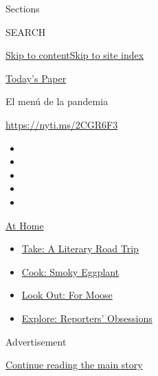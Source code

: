 Sections

SEARCH

\protect\hyperlink{site-content}{Skip to
content}\protect\hyperlink{site-index}{Skip to site index}

\href{https://myaccount.nytimes3xbfgragh.onion/auth/login?response_type=cookie\&client_id=vi}{}

\href{https://www.nytimes3xbfgragh.onion/section/todayspaper}{Today's
Paper}

El menú de la pandemia

\url{https://nyti.ms/2CGR6F3}

\begin{itemize}
\item
\item
\item
\item
\item
\end{itemize}

\href{https://www.nytimes3xbfgragh.onion/spotlight/at-home?action=click\&pgtype=Article\&state=default\&region=TOP_BANNER\&context=at_home_menu}{At
Home}

\begin{itemize}
\tightlist
\item
  \href{https://www.nytimes3xbfgragh.onion/2020/07/28/books/time-for-a-literary-road-trip.html?action=click\&pgtype=Article\&state=default\&region=TOP_BANNER\&context=at_home_menu}{Take:
  A Literary Road Trip}
\item
  \href{https://www.nytimes3xbfgragh.onion/2020/07/29/magazine/bored-with-your-home-cooking-some-smoky-eggplant-will-fix-that.html?action=click\&pgtype=Article\&state=default\&region=TOP_BANNER\&context=at_home_menu}{Cook:
  Smoky Eggplant}
\item
  \href{https://www.nytimes3xbfgragh.onion/2020/07/27/travel/moose-michigan-isle-royale.html?action=click\&pgtype=Article\&state=default\&region=TOP_BANNER\&context=at_home_menu}{Look
  Out: For Moose}
\item
  \href{https://www.nytimes3xbfgragh.onion/interactive/2020/at-home/even-more-reporters-editors-diaries-lists-recommendations.html?action=click\&pgtype=Article\&state=default\&region=TOP_BANNER\&context=at_home_menu}{Explore:
  Reporters' Obsessions}
\end{itemize}

Advertisement

\protect\hyperlink{after-top}{Continue reading the main story}

